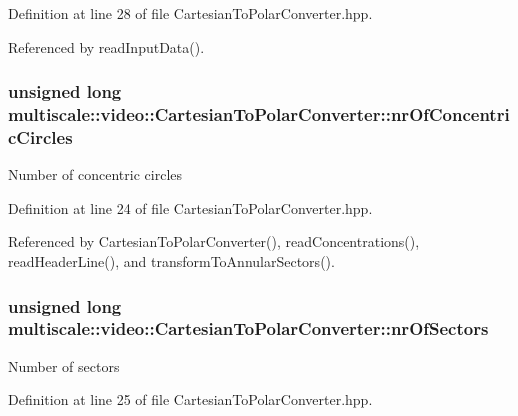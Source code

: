 Definition at line 28 of file Cartesian\-To\-Polar\-Converter.\-hpp.



Referenced by read\-Input\-Data().

\hypertarget{classmultiscale_1_1video_1_1CartesianToPolarConverter_ab7c8564deaa38c57a251ba9592903238}{
\subsubsection[{nr\-Of\-Concentric\-Circles}]{\setlength{\rightskip}{0pt plus 5cm}unsigned long multiscale\-::video\-::\-Cartesian\-To\-Polar\-Converter\-::nr\-Of\-Concentric\-Circles\hspace{0.3cm}{\ttfamily [private]}}}\label{classmultiscale_1_1video_1_1CartesianToPolarConverter_ab7c8564deaa38c57a251ba9592903238}
Number of concentric circles 

Definition at line 24 of file Cartesian\-To\-Polar\-Converter.\-hpp.



Referenced by Cartesian\-To\-Polar\-Converter(), read\-Concentrations(), read\-Header\-Line(), and transform\-To\-Annular\-Sectors().

\hypertarget{classmultiscale_1_1video_1_1CartesianToPolarConverter_a62a2f5abe655f440e7c41fe834f828d0}{
\subsubsection[{nr\-Of\-Sectors}]{\setlength{\rightskip}{0pt plus 5cm}unsigned long multiscale\-::video\-::\-Cartesian\-To\-Polar\-Converter\-::nr\-Of\-Sectors\hspace{0.3cm}{\ttfamily [private]}}}\label{classmultiscale_1_1video_1_1CartesianToPolarConverter_a62a2f5abe655f440e7c41fe834f828d0}
Number of sectors 

Definition at line 25 of file Cartesian\-To\-Polar\-Converter.\-hpp.



